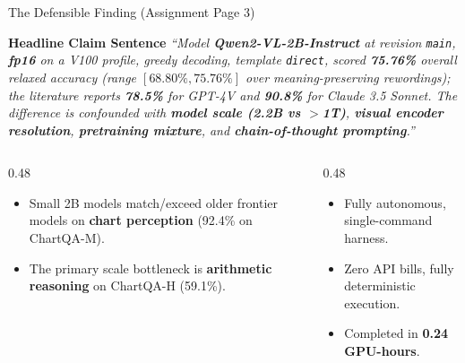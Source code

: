 \documentclass[aspectratio=169, 10pt]{beamer}
\begin{document}
\begin{frame}{The Defensible Finding (Assignment Page 3)}
    \begin{block}{\textbf{Headline Claim Sentence}}
        \normalsize
        \textit{``Model \textbf{Qwen2-VL-2B-Instruct} at revision \texttt{main}, \textbf{fp16} on a V100 profile, greedy decoding, template \texttt{direct}, scored \textbf{75.76\%} overall relaxed accuracy (range $[\mathbf{68.80\%, 75.76\%}]$ over meaning-preserving rewordings); the literature reports \textbf{78.5\%} for GPT-4V and \textbf{90.8\%} for Claude 3.5 Sonnet. The difference is confounded with \textbf{model scale (2.2B vs $>$1T)}, \textbf{visual encoder resolution}, \textbf{pretraining mixture}, and \textbf{chain-of-thought prompting}.''}
    \end{block}

    \vspace{0.3cm}
    \begin{columns}[T]
        \begin{column}{0.48\textwidth}
            \begin{tcolorbox}[title=\textbf{What the Instrument Proves}]
                \small
                \begin{itemize}
                    \item Small 2B models match/exceed older frontier models on \textbf{chart perception} (92.4\% on ChartQA-M).
                    \item The primary scale bottleneck is \textbf{arithmetic reasoning} on ChartQA-H (59.1\%).
                \end{itemize}
            \end{tcolorbox}
        \end{column}

        \begin{column}{0.48\textwidth}
            \begin{tcolorbox}[title=\textbf{Setup Reproducibility}]
                \small
                \begin{itemize}
                    \item Fully autonomous, single-command harness.
                    \item Zero API bills, fully deterministic execution.
                    \item Completed in \textbf{0.24 GPU-hours}.
                \end{itemize}
            \end{tcolorbox}
        \end{column}
    \end{columns}
\end{frame}
\end{document}

